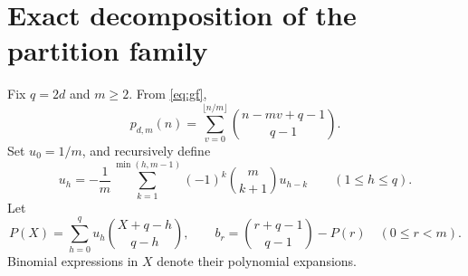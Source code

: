 \documentclass[11pt,reqno]{amsart}
\theoremstyle{remark}
\begin{document}
\section{Exact decomposition of the partition family}\label{sec:partition}

Fix \(q=2d\) and \(m\ge2\). From \eqref{eq:gf},
\begin{equation}\label{eq:direct}
 p_{d,m}(n)=\sum_{v=0}^{\lfloor n/m\rfloor}
               \binom{n-mv+q-1}{q-1}.
\end{equation}
Set \(u_0=1/m\), and recursively define
\begin{equation}\label{eq:u}
 u_h=-\frac1m\sum_{k=1}^{\min(h,m-1)}
             (-1)^k\binom{m}{k+1}u_{h-k}
       \qquad(1\le h\le q).
\end{equation}
Let
\begin{equation}\label{eq:P}
 P(X)=\sum_{h=0}^qu_h\binom{X+q-h}{q-h},
 \qquad
 b_r=\binom{r+q-1}{q-1}-P(r)\quad(0\le r<m).
\end{equation}
Binomial expressions in \(X\) denote their polynomial expansions.
\end{document}

